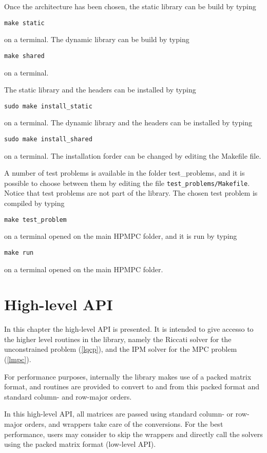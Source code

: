 \documentclass[a4paper]{report}
\begin{document}
Once the architecture has been chosen, the static library can be build by typing
\begin{verbatim}
make static
\end{verbatim}
on a terminal. The dynamic library can be build by typing
\begin{verbatim}
make shared
\end{verbatim}
on a terminal.

The static library and the headers can be installed by typing
\begin{verbatim}
sudo make install_static
\end{verbatim}
on a terminal. The dynamic library and the headers can be installed by typing
\begin{verbatim}
sudo make install_shared
\end{verbatim}
on a terminal. The installation forder can be changed by editing the Makefile file.

A number of test problems is available in the folder test\_problems, and it is possible to choose between them by editing the file {\tt test\_problems/Makefile}.
Notice that test problems are not part of the library.
The chosen test problem is compiled by typing
\begin{verbatim}
make test_problem
\end{verbatim}
on a terminal opened on the main HPMPC folder, and it is run by typing
\begin{verbatim}
make run 
\end{verbatim}
on a terminal opened on the main HPMPC folder.



\chapter{High-level API}

In this chapter the high-level API is presented. 
It is intended to give accesso to the higher level routines in the library, namely the Riccati solver for the unconstrained problem (\ref{lqcp}), and the IPM solver for the MPC problem (\ref{lmpc}).

For performance purposes, internally the library makes use of a packed matrix format, and routines are provided to convert to and from this packed format and standard column- and row-major orders.

In this high-level API, all matrices are passed using standard column- or row-major orders, and wrappers take care of the conversions.
For the best performance, users may consider to skip the wrappers and directly call the solvers using the packed matrix format (low-level API).
\end{document}
